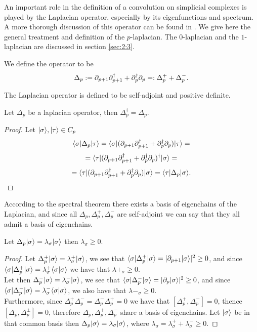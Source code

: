 \documentclass[../1.tex]{subfiles}
\begin{document}
    \label{app:C}
    An important role in the definition of a convolution on simplicial complexes is played by the Laplacian operator,
    especially by its eigenfunctions and spectrum. A more thorough discussion of this operator can be found in \cite{laplacian}.
    We give here the general treatment and definition of the $p$-laplacian. The $0$-laplacian and the $1$-laplacian are discussed in section \ref{sec:2:3}.
    
    \begin{defn}
        We define the  operator to be 
        \[ \Delta_p := \partial_{p+1}\partial^\dagger_{p+1} + \partial^\dagger_p\partial_p =: \Delta^+_p + \Delta^-_p.\]
    \end{defn}

    The Laplacian operator is defined to be self-adjoint and positive definite.

    \begin{prop}
        Let $\Delta_p$ be a laplacian operator, then $\Delta^\dagger_p = \Delta_p.$
    \end{prop}
    \begin{proof}
        Let $| \sigma \rangle, | \tau \rangle \in C_p$ 
        \[ \langle \sigma |\Delta_p| \tau \rangle=\langle \sigma |(\partial_{p+1}\partial^\dagger_{p+1} + \partial^\dagger_p\partial_p)| \tau \rangle = \]
        \[ = \langle \tau |(\partial_{p+1}\partial^\dagger_{p+1} + \partial^\dagger_p\partial_p)^\dagger| \sigma \rangle = \]
        \[ = \langle \tau |(\partial_{p+1}\partial^\dagger_{p+1} + \partial^\dagger_p\partial_p)| \sigma \rangle = \langle \tau |\Delta_p| \sigma \rangle. \qedhere \]
    \end{proof}

    According to the spectral theorem there exists a basis of eigenchains of the Laplacian, and since all $\Delta_p, \Delta^+_p, \Delta^-_p$
    are self-adjoint we can say that they all admit a basis of eigenchains.

    \begin{prop}
        Let $\Delta_p| \sigma \rangle = \lambda_\sigma| \sigma \rangle$ then $\lambda_\sigma \geq 0$.
    \end{prop}
    \begin{proof}
        Let $\Delta^+_p| \sigma \rangle = \lambda^+_\sigma | \sigma \rangle$, we see that $\langle \sigma |\Delta^+_p| \sigma \rangle = | \partial_{p+1}| \sigma \rangle |^2 \geq 0$, and since
        $\langle \sigma |\Delta^+_p| \sigma \rangle = \lambda^+_\sigma\langle \sigma | \sigma \rangle$ we have that $\lambda+_\sigma \geq 0.$\\
        Let then $\Delta^-_p| \sigma \rangle = \lambda^-_\sigma | \sigma \rangle$, we see that $\langle \sigma |\Delta^-_p| \sigma \rangle = | \partial_p | \sigma \rangle |^2 \geq 0$, and since
        $\langle \sigma |\Delta^-_p| \sigma \rangle = \lambda^-_\sigma\langle \sigma | \sigma \rangle$, we also have that $\lambda-_\sigma \geq 0.$\\
        Furthermore, since $\Delta^+_p\Delta^-_p = \Delta^-_p\Delta^+_p = 0$ we have that $[\Delta^+_p,\Delta^-_p] = 0$, thence
        $[\Delta_p, \Delta^\pm_p] = 0$, therefore $\Delta_p, \Delta^+_p, \Delta^-_p$ share a basis of eigenchains.
        Let $| \sigma \rangle$ be in that common basis then $\Delta_p| \sigma \rangle = \lambda_\sigma| \sigma \rangle$, where
        $\lambda_\sigma = \lambda^+_\sigma + \lambda^-_\sigma \geq 0$. \qedhere
    \end{proof}
\end{document}
